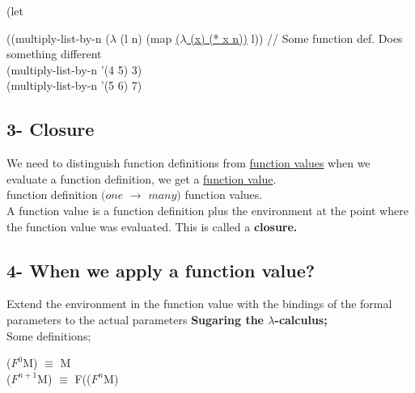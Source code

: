 \documentclass{article}
\begin{document}
\begin{flushleft}
(let
   
  \hspace{0.5cm}((multiply-list-by-n ($\lambda$ (l n) (map \underline{($\lambda$ (x) (* x n))} l)) // Some function def. Does something different\\
  \hspace{1cm}(multiply-list-by-n '(4 5) 3)\\
  \hspace{1cm}(multiply-list-by-n '(5 6) 7)\\

\end{flushleft}


\subsection*{3- Closure}
\begin{flushleft}
We need to distinguish function definitions from \underline{function values} when we evaluate a function definition, we get a \underline{function value}. \\

\doublespacing
function definition $(one$ $\rightarrow$ $many)$ function values.\\

A function value is a function definition plus the environment at the point where the function value was evaluated. This is called a \textbf {closure.}
\end{flushleft}

\subsection*{4- When we apply a function value?}

Extend the environment in the function value with the bindings of the formal parameters to the actual parameters
\doublespacing
\textbf{Sugaring the $\lambda$-calculus; }\\
\vspace{2mm} Some definitions;

($F^{0}$M)  $\equiv$ M\\
($F^{n+1}$M)  $\equiv$ F(($F^{n}$M)\\
\end{document}
